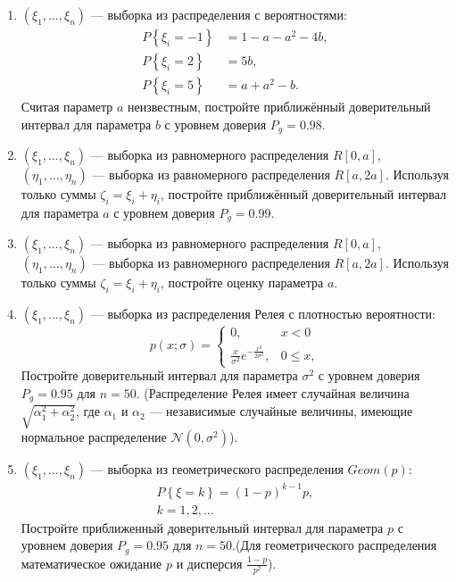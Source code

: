 \documentclass[a4paper,12pt]{article}
\newcommand{\probability}[1]{P \left\{ #1 \right\}}
\newcommand{\sample}[2]{\left( #1_1, \dots, #1_{#2} \right)}
\begin{document}
\begin{enumerate}[topsep=1cm, parsep=1cm, resume]
        \item $\sample{\xi}{n}$ --- выборка из распределения с вероятностями:
              \begin{align*}
                  \probability{\xi_i = -1} & = 1 - a - a^2 - 4b , \\
                  \probability{\xi_i = 2}  & =  5b ,              \\
                  \probability{\xi_i = 5}  & = a + a^2 - b .
              \end{align*}
              Считая параметр $a$ неизвестным, постройте приближённый доверительный интервал для параметра $b$ с уровнем доверия $P_g = 0.98$.

        \item $\sample{\xi}{n}$ --- выборка из равномерного распределения $R[0,a]$, $\sample{\eta}{n}$ --- выборка из равномерного распределения $R[a, 2a]$.
              Используя только суммы $\zeta_i = \xi_i + \eta_i$, постройте приближённый доверительный интервал для параметра $a$
              с уровнем доверия $P_g = 0.99$.

        \item $\sample{\xi}{n}$ --- выборка из равномерного распределения $R[0,a]$, $\sample{\eta}{n}$ --- выборка из равномерного распределения $R[a, 2a]$.
              Используя только суммы $\zeta_i = \xi_i + \eta_i$, постройте оценку параметра $a$.

        \item $\sample{\xi}{n}$ --- выборка из распределения Релея с плотностью вероятности:
              \[
                  p(x; \sigma)
                  = \left \{
                  \begin{array}{ll}
                      0,                                              & x < 0    \\
                      \frac{x}{\sigma^2} e^{-\frac{x^2}{2 \sigma^2}}, & 0 \le x,
                  \end{array}
                  \right .
              \]
              Постройте доверительный интервал для параметра $\sigma^2$ с уровнем доверия $P_g = 0.95$ для $n=50$. (Распределение Релея имеет
              случайная величина $\sqrt{\alpha_1^2 + \alpha_2^2}$, где $\alpha_1$ и $\alpha_2$ --- независимые случайные величины, имеющие
              нормальное распределение $\mathcal{N}(0, \sigma^2)$).

        \item $\sample{\xi}{n}$ --- выборка из геометрического распределения $Geom(p)$:
              \begin{gather*}
                  \probability{\xi = k} = (1-p)^{k-1} p , \\
                  k = 1, 2, ...
              \end{gather*}
              Постройте приближенный доверительный интервал для параметра $p$ с уровнем доверия $P_g = 0.95$ для $n = 50$.(Для геометрического
              распределения математическое ожидание $p$ и дисперсия $\frac{1-p}{p^2}$).


\end{enumerate}
\end{document}
